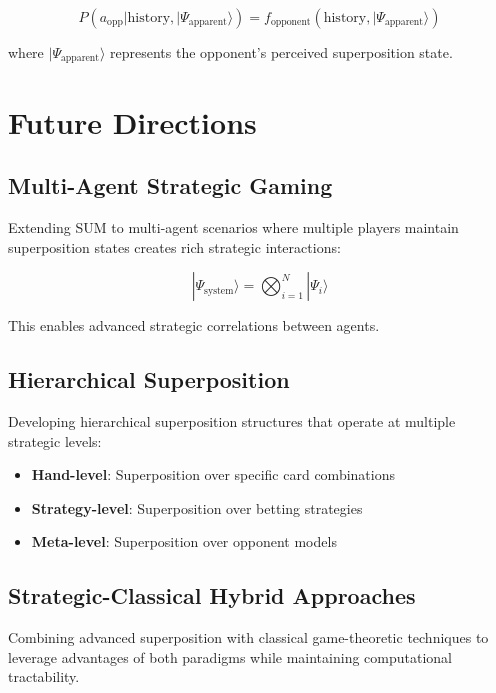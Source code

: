 \documentclass[11pt,a4paper]{article}
\begin{document}
\begin{equation}
P(a_{\text{opp}}|\text{history}, |\Psi_{\text{apparent}}\rangle) = f_{\text{opponent}}(\text{history}, |\Psi_{\text{apparent}}\rangle)
\end{equation}

where $|\Psi_{\text{apparent}}\rangle$ represents the opponent's perceived superposition state.

\section{Future Directions}

\subsection{Multi-Agent Strategic Gaming}

Extending SUM to multi-agent scenarios where multiple players maintain superposition states creates rich strategic interactions:

\begin{equation}
|\Psi_{\text{system}}\rangle = \bigotimes_{i=1}^N |\Psi_i\rangle
\end{equation}

This enables advanced strategic correlations between agents.

\subsection{Hierarchical Superposition}

Developing hierarchical superposition structures that operate at multiple strategic levels:

\begin{itemize}
\item \textbf{Hand-level}: Superposition over specific card combinations
\item \textbf{Strategy-level}: Superposition over betting strategies
\item \textbf{Meta-level}: Superposition over opponent models
\end{itemize}

\subsection{Strategic-Classical Hybrid Approaches}

Combining advanced superposition with classical game-theoretic techniques to leverage advantages of both paradigms while maintaining computational tractability.
\end{document}
